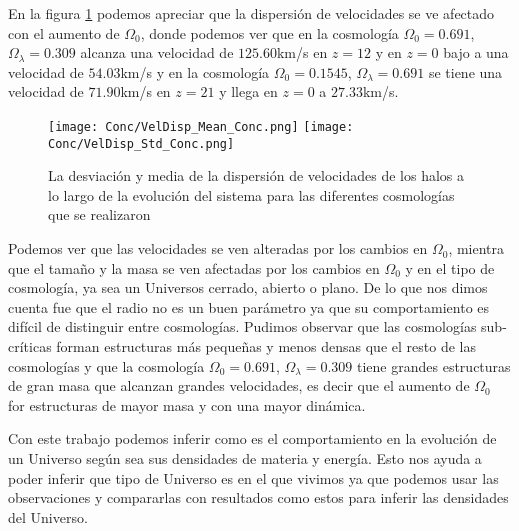 En la figura \ref{fig:Conc_VelDisp} podemos apreciar que la dispersión de velocidades se ve afectado con el aumento de $\Omega_0$, donde podemos ver que en la cosmología $\Omega_0 = 0.691$, $\Omega_\lambda = 0.309$ alcanza una velocidad de $125.60$km/s en $z=12$ y en $z=0$ bajo a una velocidad de $54.03$km/s y en la cosmología  $\Omega_0 = 0.1545$, $\Omega_\lambda = 0.691$ se tiene una velocidad de $71.90$km/s en $z=21$ y llega en $z=0$ a $27.33$km/s. 

\begin{figure}[H]
      \centering
      \texttt{[image: Conc/VelDisp\_Mean\_Conc.png]}
      \texttt{[image: Conc/VelDisp\_Std\_Conc.png]}
      \caption[Evolución de la desviación y media de la dispersión de velocidades los halos para todas las cosmologías]{La desviación y media de la dispersión de velocidades de los halos a lo largo de la evolución del sistema para las diferentes cosmologías que se realizaron}
      \label{fig:Conc_VelDisp}
\end{figure}

Podemos ver que las velocidades se ven alteradas por los cambios en $\Omega_0$, mientra que el tamaño y la masa se ven afectadas por los cambios en $\Omega_0$ y en el tipo de cosmología, ya sea un Universos cerrado, abierto o plano. De lo que nos dimos cuenta fue que el radio no es un buen parámetro ya que su comportamiento es difícil de distinguir entre cosmologías.  Pudimos observar que las cosmologías sub-críticas forman estructuras más pequeñas y menos densas que el resto de las cosmologías y que la cosmología $\Omega_0 = 0.691$, $\Omega_\lambda = 0.309$ tiene grandes estructuras de gran masa que alcanzan grandes velocidades, es decir que el aumento de $\Omega_0$ for estructuras de mayor masa y con una mayor dinámica.

Con este trabajo podemos inferir como es el comportamiento en la evolución de un Universo según sea sus densidades de materia y energía. Esto nos ayuda a poder inferir que tipo de Universo es en el que vivimos ya que podemos usar las observaciones y compararlas con resultados como estos para inferir las densidades del Universo.
 

\lhead[\fancyplain{}{}]%
      {\fancyplain{}{\bfseries\rightmark}}
